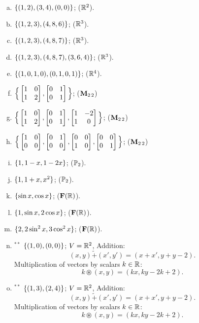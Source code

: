 \begin{prob}
\begin{enumerate}[a)]
\item\sov $\{(1,2), (3,4), (0,0) \} $; ($\mathbb{R}^2$).\medskip

\item  $\{(1,2,3), (4,8,6) \}$; ($\mathbb{R}^3$). \medskip
%

\item\sov $\{(1,2,3), (4,8,7) \}$; ($\mathbb{R}^3$).\medskip
%

\item $\{(1,2,3), (4,8,7), (3,6,4) \}$; ($\mathbb{R}^3$).\medskip
%
\item\sov $\{(1,0,1,0), (0,1,0,1) \}$; ($\mathbb{R}^4$).\medskip
%

\item  $\Big\{\bmatrix 1&0\\1&2\endbmatrix, \bmatrix 0&1\\0&1\endbmatrix \Big\}$; ($\mathbf{M}_{2 \,2}$)\medskip
%

\item\sov  $\Big\{\bmatrix 1&0\\1&2\endbmatrix, \bmatrix 0&1\\0&1\endbmatrix , \bmatrix 1&-2\\1&0\endbmatrix \Big\}$; ($\mathbf{M}_{2 \,2}$)\medskip
%

\item  $\Big\{\bmatrix 1&0\\0&0\endbmatrix, \bmatrix 0&1\\0&0\endbmatrix,\bmatrix 0&0\\1&0\endbmatrix,\bmatrix 0&0\\0&1\endbmatrix \Big\}$; ($\mathbf{M}_{2 \,2}$)\medskip
%
 
\item  $\{1, 1-x, 1-2x \}$; ($\mathbb{P}_2$). \medskip
%
\item\sov  $\{1, 1+x, x^2 \}$; ($\mathbb{P}_2$). \medskip 
%
\item  $\{ \sin x,  \cos x \}$; ($\mathbf{F}(\mathbb{R})$). \medskip  
%
\item\sov  $\{1, \sin x, 2 \cos x \}$; ($\mathbf{F}(\mathbb{R})$). \medskip  
%
\item  $\{2, 2\sin^2 x,  3\cos^2 x \}$; ($\mathbf{F}(\mathbb{R})$). \medskip  
%
\item$^{\ast\ast}$ $\{(1,0), (0,0) \}$; $ V=\mathbb{R}^2$,   Addition: $$(x,y) \tilde+ (x',y')=(x+x', y+y-2).$$ Multiplication of vectors  by  scalars $k\in \mathbb{R}$: $$k\circledast (x,y)=(kx, ky-2k+2).$$     \medskip
%
\item$^{\ast\ast}$ $\{(1,3), (2,4) \}$; $ V=\mathbb{R}^2$,   Addition: $$(x,y) \tilde+ (x',y')=(x+x', y+y-2).$$ Multiplication of vectors  by  scalars $k\in \mathbb{R}$: $$k\circledast (x,y)=(kx, ky-2k+2).$$     \medskip
%
\end{enumerate}
 


\end{prob}
